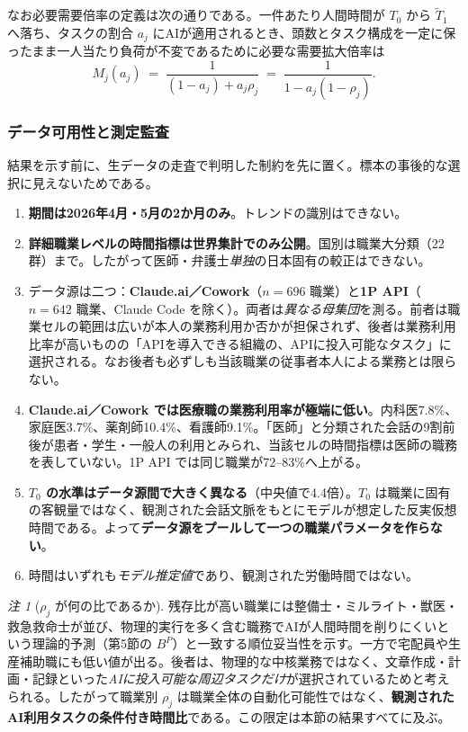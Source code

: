 \documentclass[11pt]{article}
\theoremstyle{plain}
\theoremstyle{definition}
\theoremstyle{remark}
\newtheorem*{rmk}{注}
\begin{document}
なお必要需要倍率の定義は次の通りである。一件あたり人間時間が $T_0$ から $\tilde T_1$ へ落ち、タスクの割合 $a_j$ にAIが適用されるとき、頭数とタスク構成を一定に保ったまま一人当たり負荷が不変であるために必要な需要拡大倍率は
\begin{equation}\label{eq:Mja}
M_j(a_j)\;=\;\frac{1}{(1-a_j)+a_j\rho_j}\;=\;\frac{1}{1-a_j(1-\rho_j)} .
\end{equation}

\subsubsection{データ可用性と測定監査}
結果を示す前に、生データの走査で判明した制約を先に置く。標本の事後的な選択に見えないためである。

\begin{enumerate}[label=(\alph*),leftmargin=1.8em,itemsep=1pt]
\item \textbf{期間は2026年4月・5月の2か月のみ}。トレンドの識別はできない。
\item \textbf{詳細職業レベルの時間指標は世界集計でのみ公開}。国別は職業大分類（22群）まで。したがって医師・弁護士\emph{単独}の日本固有の較正はできない。
\item データ源は二つ：\textbf{Claude.ai／Cowork}（$n=696$ 職業）と\textbf{1P API}（$n=642$ 職業、Claude Code を除く）。両者は\emph{異なる母集団}を測る。前者は職業セルの範囲は広いが本人の業務利用か否かが担保されず、後者は業務利用比率が高いものの「APIを導入できる組織の、APIに投入可能なタスク」に選択される。なお後者も必ずしも当該職業の従事者本人による業務とは限らない。
\item \textbf{Claude.ai／Cowork では医療職の業務利用率が極端に低い}。内科医7.8\%、家庭医3.7\%、薬剤師10.4\%、看護師9.1\%。「医師」と分類された会話の9割前後が患者・学生・一般人の利用とみられ、当該セルの時間指標は医師の職務を表していない。1P API では同じ職業が72--83\%へ上がる。
\item \textbf{$T_0$ の水準はデータ源間で大きく異なる}（中央値で4.4倍）。$T_0$ は職業に固有の客観量ではなく、観測された会話文脈をもとにモデルが想定した反実仮想時間である。よって\textbf{データ源をプールして一つの職業パラメータを作らない}。
\item 時間はいずれも\emph{モデル推定値}であり、観測された労働時間ではない。
\end{enumerate}

\begin{rmk}[$\rho_j$ が何の比であるか]\label{rmk:estimand}
残存比が高い職業には整備士・ミルライト・獣医・救急救命士が並び、物理的実行を多く含む職務でAIが人間時間を削りにくいという理論的予測（第5節の $B^P$）と一致する順位妥当性を示す。一方で宅配員や生産補助職にも低い値が出る。後者は、物理的な中核業務ではなく、文章作成・計画・記録といった\emph{AIに投入可能な周辺タスクだけ}が選択されているためと考えられる。したがって職業別 $\rho_j$ は職業全体の自動化可能性ではなく、\textbf{観測されたAI利用タスクの条件付き時間比}である。この限定は本節の結果すべてに及ぶ。
\end{rmk}
\end{document}
